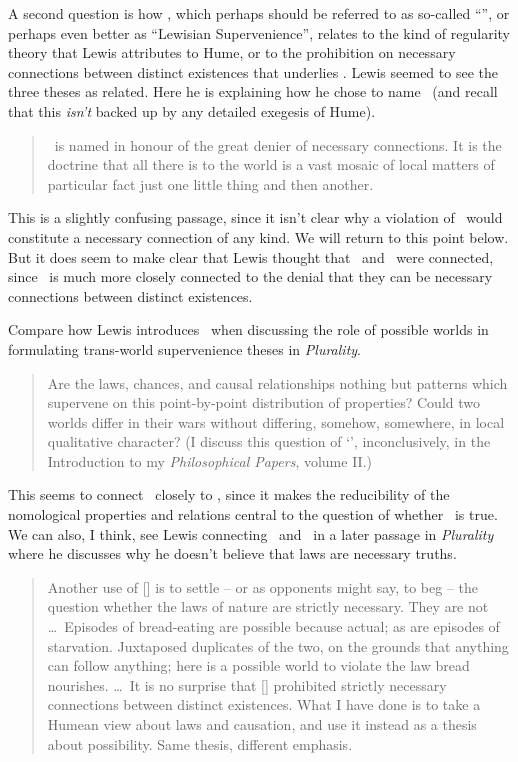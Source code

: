 A second question is how \HS, which perhaps should be referred to as so-called ``\HS'', or perhaps even better as ``Lewisian Supervenience'', relates to the kind of regularity theory that Lewis attributes to Hume, or to the prohibition on  necessary connections between distinct existences that underlies \MC.  Lewis seemed  to see the three theses as related.  Here he is explaining how he chose to name \HS\ (and recall that this \textit{isn't} backed up by any detailed exegesis of Hume).

\begin{quote}
\HS\  is named in honour of the great denier of necessary connections. It is the doctrine that all there is to the world is a vast mosaic of local matters of particular fact just one little thing and then another. \citep[ix]{Lewis1986b}
\end{quote}

\noindent  This is a slightly confusing passage, since it isn't clear why a violation of \HS\  would constitute a necessary connection of any kind. We will return to this point below. But it does seem to make clear that Lewis thought that \HS\ and \MC\  were connected, since \MC\ is much more closely connected to the denial that they can be necessary connections between distinct existences.

Compare how  Lewis introduces \HS\  when discussing the role of possible worlds in formulating trans-world  supervenience theses in \textit{Plurality}.

\begin{quote}
Are the laws, chances, and causal relationships nothing but patterns which supervene on this point-by-point distribution of properties? Cou\-ld two worlds differ in their wars without differing, somehow, somewhere, in local qualitative character? (I discuss this question of `\HS', inconclusively, in the Introduction to my \textit{Philosophical Papers}, volume II.) \citep[14]{Lewis1986a}
\end{quote}

\noindent  This seems to connect \HS\  closely to \NR,  since it makes the reducibility of the nomological  properties and relations central to the question of whether \HS\ is true. We can also, I think, see Lewis connecting \MC\ and \NR\  in a later passage in \textit{Plurality}  where he discusses why he doesn't believe that laws are necessary truths.

\begin{quote}
 Another use of [\MC]  is to settle -- or as opponents might say, to beg -- the question whether the laws of nature are strictly necessary. They are not \dots\  Episodes of bread-eating are possible because actual; as are episodes of starvation. Juxtaposed duplicates of the two, on the grounds that anything can follow anything; here is a possible world to violate the law bread nourishes. \dots\  It is no surprise that [\MC]  prohibited strictly necessary connections between distinct existences. What I have done is to take a Humean view about laws and causation, and use it instead as a thesis about possibility. Same thesis, different emphasis. \citep[91]{Lewis1986a}
\end{quote}

